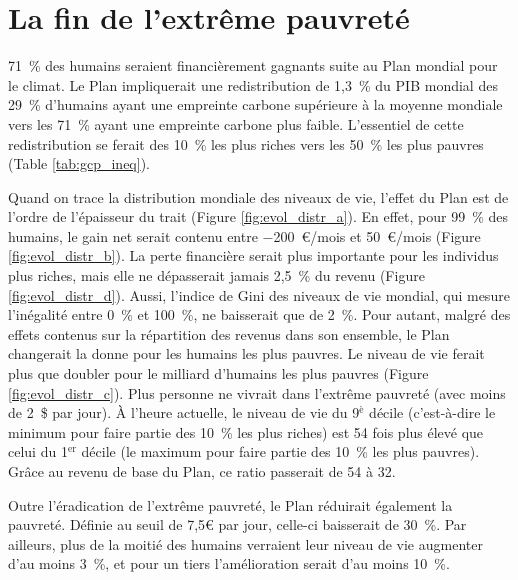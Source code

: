 \documentclass[a5paper,french]{memoir}
\begin{document}
\section{La fin de l'extrême pauvreté}

71~\% des humains seraient financièrement gagnants suite au Plan mondial pour le climat. Le Plan impliquerait une redistribution de 1,3~\% du PIB mondial des 29~\% d'humains ayant une empreinte carbone supérieure à la moyenne mondiale vers les 71~\% ayant une empreinte carbone plus faible. L'essentiel %
de cette redistribution se ferait des 10~\% les plus riches vers les 50~\% les plus pauvres (Table \ref{tab:gcp_ineq}). 



Quand on trace la distribution mondiale des niveaux de vie, l'effet du Plan est de l'ordre de l'épaisseur du trait (Figure \ref{fig:evol_distr_a}). En effet, pour 99~\% des humains, le gain net serait contenu entre $-$200~\euro{}/mois et 50~\euro{}/mois (Figure \ref{fig:evol_distr_b}). La perte financière serait plus importante pour les individus plus riches, mais elle ne dépasserait jamais 2,5~\% du revenu (Figure \ref{fig:evol_distr_d}). Aussi, l'indice de Gini des niveaux de vie mondial, qui mesure l'inégalité entre 0~\% et 100~\%, ne baisserait que de 2~\%. 
Pour autant, malgré des effets contenus sur la répartition des revenus dans son ensemble, le Plan changerait la donne pour les humains les plus pauvres. Le niveau de vie ferait plus que doubler pour le milliard d'humains les plus pauvres (Figure \ref{fig:evol_distr_c}). Plus personne ne vivrait dans l'extrême pauvreté (avec moins de 2~\$ par jour). %
À l'heure actuelle, le niveau de vie du 9$^\text{è}$ décile (c'est-à-dire le minimum pour faire partie des 10~\% les plus riches) est 54 fois plus élevé que celui du 1$^\text{er}$ décile (le maximum pour faire partie des 10~\% les plus pauvres). Grâce au revenu de base du Plan, ce ratio passerait de 54 à 32. 

Outre l'éradication de l'extrême pauvreté, le Plan réduirait également la pauvreté. Définie au seuil de 7,5\euro{} par jour, celle-ci baisserait de 30~\%. Par ailleurs, plus de la moitié des humains verraient leur niveau de vie augmenter d'au moins 3~\%, et pour un tiers l'amélioration serait d'au moins 10~\%. 
\end{document}
